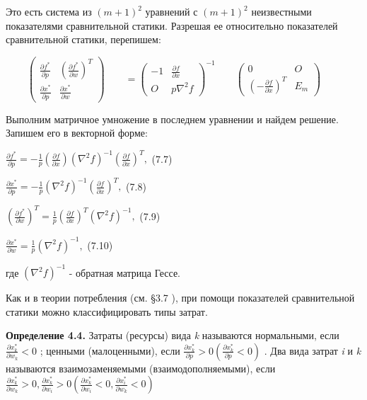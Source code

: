 \documentclass[12pt, 4paper]{book}
\begin{document}
{Это есть система из $(m+1)^2$ уравнений с $(m+1)^2$ неизвестными показателями сравнительной статики. Разрешая ее относительно показателей сравнительной статики, перепишем: 

\[
\begin{pmatrix} \frac{\partial f^{*}}{\partial p} & (\frac{\partial f^{*}}{\partial w})^{T} \\ \frac{\partial x^{*}}{\partial p} & \frac{\partial x^{*}}{\partial w} \end{pmatrix} \qquad =
\begin{pmatrix} -1 & \frac{\partial f}{\partial x} \\ O & p\nabla^2 f \end{pmatrix}^{-1}  \qquad 
\begin{pmatrix} 0 & O\\ (-\frac{\partial f}{\partial x})^{T} & E_m \end{pmatrix} \qquad
\]

\par

Выполним матричное умножение в последнем уравнении и найдем решение. Запишем его в векторной форме: 
\begin{center}
$\frac{\partial f^{*}}{\partial p} = -\frac{1}{p}(\frac{\partial f}{\partial x})(\nabla^2 f)^{-1} (\frac{ \partial f}{\partial x})^{T},$ (7.7)
\end{center}
\begin{center}
$\frac{\partial x^{*}}{\partial p} = -\frac{1}{p}(\nabla^2 f)^{-1} (\frac{ \partial f}{\partial x})^{T},$ (7.8)
\end{center}
\begin{center}
$(\frac{\partial f^{*}}{\partial w})^{T} = \frac{1}{p}(\frac{\partial f}{\partial x})^{T}(\nabla^2 f)^{-1} ,$ (7.9)
\end{center}
\begin{center}
$\frac{\partial x^{*}}{\partial w} = \frac{1}{p}(\nabla^2 f)^{-1} ,$ (7.10)
\end{center}
\par

где $(\nabla^2 f)^{-1}$ - обратная матрица Гессе. 
\par

Как и в теории потребления (см. §3.7 ), при помощи показателей сравнительной статики можно классифицировать типы затрат. 
\par

\textbf{Определение 4.4.} Затраты (ресурсы) вида \textit{k} называются нормальными, если $\frac{\partial x_{k}^{*}}{\partial w_k}<0$ ; ценными (малоценными), если $\frac{\partial x_{k}^{*}}{\partial p} >0 (\frac{\partial x_{k}^{*}}{\partial p} <0)$ . Два вида затрат \textit{i} и \textit{k} называются взаимозаменяемыми (взаимодополняемыми), если  
$\frac{\partial x_{k}^{*}}{\partial w_k} > 0 , \frac{\partial x_{k}^{*}}{\partial w_i} > 0 (\frac{\partial x_{k}^{*}}{\partial w_i}< 0, \frac{\partial x_{i}^{*}}{\partial w_k} < 0)$  
\par

}
\end{document}
